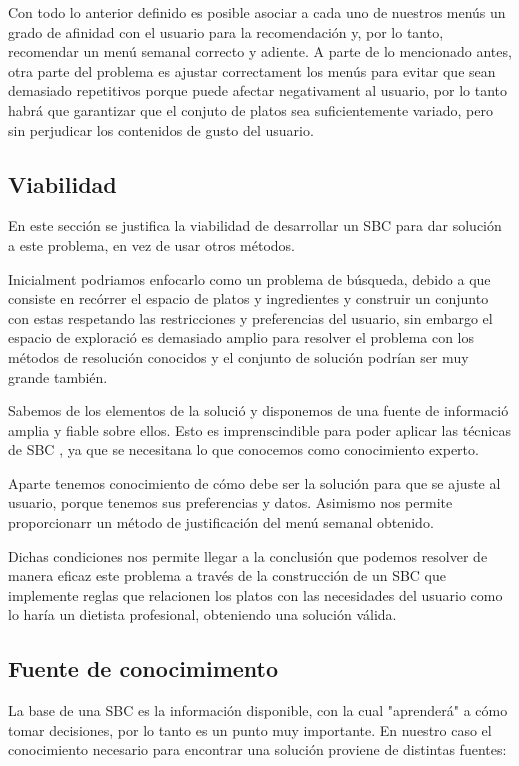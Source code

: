 \documentclass[11pt]{article}
\begin{document}
Con todo lo anterior definido es posible asociar a cada uno de nuestros menús un grado de afinidad con el usuario para la recomendación y, por lo tanto, recomendar un menú semanal correcto y adiente. A parte de lo mencionado antes, otra parte del problema es ajustar correctament los menús para evitar que sean demasiado repetitivos porque puede afectar negativament al usuario, por lo tanto habrá que garantizar que el conjuto de platos sea suficientemente variado, pero sin perjudicar los contenidos de gusto del usuario.

\subsection{Viabilidad}

En este sección se justifica la viabilidad de desarrollar un SBC para dar solución a este problema, en vez de usar otros métodos.

Inicialment podriamos enfocarlo como un problema de búsqueda, debido a que consiste en recórrer el espacio de platos y ingredientes y construir un conjunto con estas respetando las restricciones y preferencias del usuario, sin embargo el espacio de exploració es demasiado amplio para resolver el problema con los métodos de resolución conocidos y el conjunto de solución podrían ser muy grande también.

Sabemos de los elementos de la solució y disponemos de una fuente de informació amplia y fiable sobre ellos. Esto es imprenscindible para poder aplicar las técnicas de SBC , ya que se necesitana lo que conocemos como conocimiento experto.

Aparte tenemos conocimiento de cómo debe ser la solución para que se ajuste al usuario, porque tenemos sus preferencias y datos. Asimismo nos permite proporcionarr un método de justificación del menú semanal obtenido.

Dichas condiciones nos permite llegar a la conclusión que podemos resolver de manera eficaz este problema a través de la construcción de un SBC que implemente reglas que relacionen los platos con las necesidades del usuario como lo haría un dietista profesional, obteniendo una solución válida. 

\subsection{Fuente de conocimimento}

La base de una SBC es la información disponible, con la cual "aprenderá" a cómo tomar decisiones, por lo tanto es un punto muy importante. En nuestro caso el conocimiento necesario para encontrar una solución proviene de distintas fuentes:
\end{document}
